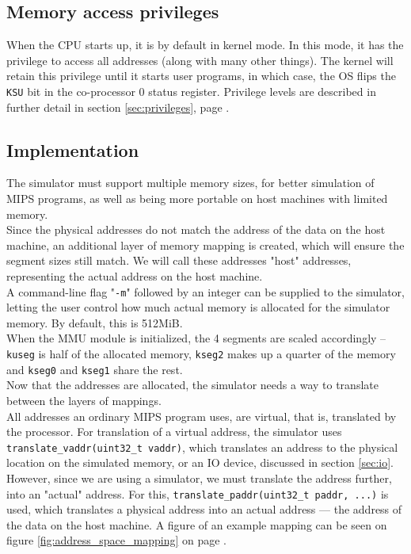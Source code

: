 \subsection{Memory access privileges}
When the CPU starts up, it is by default in kernel mode. In this mode, it has
the privilege to access all addresses (along with many other things). The
kernel will retain this privilege until it starts user programs, in which case,
the OS flips the \texttt{KSU} bit in the co-processor 0 status register\cite{harvard_mips_summary}.
Privilege levels are described in further detail in section
\ref{sec:privileges}, page \pageref{sec:privileges}.


\subsection{Implementation}
The simulator must support multiple memory sizes, for better simulation of
MIPS programs, as well as being more portable on host machines with limited
memory.\\
Since the physical addresses do not match the address of the data on the host
machine, an additional layer of memory mapping is created, which will ensure the
segment sizes still match. We will call these addresses "host" addresses,
representing the actual address on the host machine.\\
A command-line flag "\texttt{-m}" followed by an integer can be supplied to the
simulator, letting the user control how much actual memory is allocated
for the simulator memory. By default, this is 512MiB.\\
When the MMU module is initialized, the 4 segments are scaled accordingly --
\texttt{kuseg} is half of the allocated memory, \texttt{kseg2} makes up a quarter
of the memory and \texttt{kseg0} and \texttt{kseg1} share the rest.\\
Now that the addresses are allocated, the simulator needs a way to translate
between the layers of mappings.\\
All addresses an ordinary MIPS program uses, are virtual, that is, translated by
the processor. For translation of a virtual address, the simulator uses
\texttt{translate\_vaddr(uint32\_t vaddr)}, which translates an address to the
physical location on the simulated memory, or an IO device, discussed in section
\ref {sec:io}. However, since we are using a simulator, we must translate the
address further, into an "actual" address. For this, \texttt{translate\_paddr(uint32\_t paddr, ...)}
is used, which translates a physical address into an actual address --- the
address of the data on the host machine. A figure of an example mapping can be
seen on figure \ref{fig:address_space_mapping} on page
\pageref{fig:address_space_mapping}.\\


